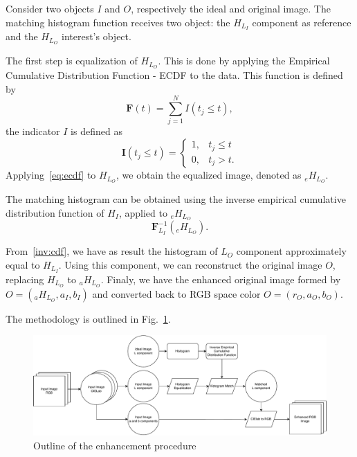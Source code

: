\documentclass{article}
\begin{document}
Consider two objects $I$ and $O$, respectively the ideal and original image.
The matching histogram function receives two object: the $H_{L_I}$ component as reference and the $H_{L_O}$ interest's object. 

The first step is equalization of $H_{L_O}$. 
This is done by applying the Empirical Cumulative Distribution Function - ECDF to the data.
This function is defined by 
\begin{equation}
    \bm F(t) = \sum_{j=1}^N I(t_j \leq t) ,
    \label{eq:ecdf}
\end{equation}
the indicator $I$ is defined as
\begin{equation}
    \bm I(t_j \leq t) = \begin{cases}
        1,  & t_j \leq t \\
        0,  & t_j > t.
    \end{cases}
\end{equation}
Applying~\eqref{eq:ecdf} to $H_{L_O}$, we obtain the equalized image, denoted as $_eH_{L_O}$. 

The matching histogram can be obtained using the inverse empirical cumulative distribution function of $H_I$, applied to $_eH_{L_O}$
\begin{equation}
    \bm F^{-1}_{L_I}(_eH_{L_O}).
    \label{inv:cdf}
\end{equation}

From~\eqref{inv:cdf}, we have as result the histogram of $L_O$ component approximately equal to $H_{L_I}$. 
Using this component, we can reconstruct the original image $O$, replacing $H_{L_O}$ to $_aH_{L_O}$. 
Finaly, we have the enhanced original image formed by $O = (_aH_{L_O}, a_I, b_I)$ and converted back to RGB space color $O = (r_O, a_O, b_O)$.

The methodology is outlined in Fig.~\ref{Fig:Outline}.

\begin{figure}
	\centering
	\includegraphics[width=.9\linewidth]{../../Diagrams/Outline}
	\caption{Outline of the enhancement procedure}\label{Fig:Outline}
\end{figure}
\end{document}

